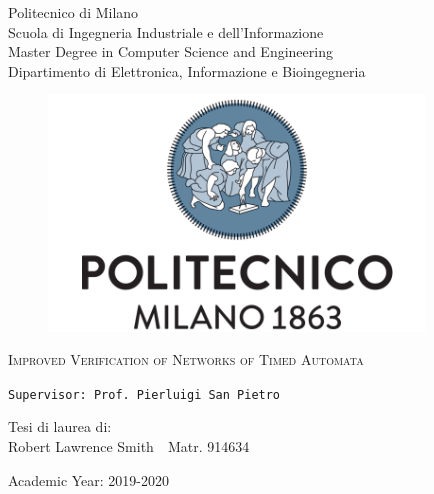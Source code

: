 \begin{titlepage}
	\bfseries{
		\begin{center}
			{\Large Politecnico di Milano\\}
			{\large
			Scuola di Ingegneria Industriale e dell'Informazione\\
			Master Degree in Computer Science and Engineering\\
			Dipartimento di Elettronica, Informazione e Bioingegneria\\}
		\end{center}
	
	}
	\vspace{1.0cm}
	\begin{figure}[h]
		\centering
		\includegraphics[width=10cm]{./frontpage/logo.png}
	\end{figure}
	\vspace{0.5cm}
	\begin{center}
		\textsc{\huge Improved Verification of Networks of Timed Automata}
	\end{center}
	\vspace{2cm}
	\begin{flushleft}
		\texttt{Supervisor: Prof. Pierluigi San Pietro}%
	\end{flushleft}
	\vspace{2cm}
	\begin{flushright}
		Tesi di laurea di:\\
		Robert Lawrence Smith\ \ Matr. 914634
	\end{flushright}
	\vspace{1cm}
	\begin{center}
		Academic Year: 2019-2020 %
	\end{center}
\end{titlepage}
